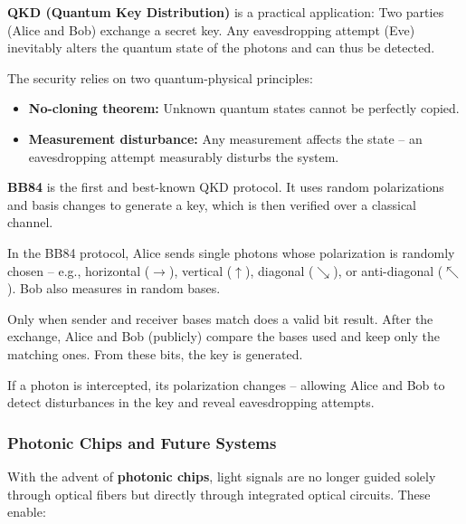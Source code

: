 \textbf{QKD (Quantum Key Distribution)} is a practical application: Two parties (Alice and Bob) exchange a secret key. Any eavesdropping attempt (Eve) inevitably alters the quantum state of the photons and can thus be detected.
\newpage
\noindent
\begin{tcolorbox}[didaktikbox, title=What Makes QKD Secure?] 
	\label{box:qkd}
	\small
	The security relies on two quantum-physical principles:
	\begin{itemize}
		\item \textbf{No-cloning theorem:} Unknown quantum states cannot be perfectly copied.
		\item \textbf{Measurement disturbance:} Any measurement affects the state – an eavesdropping attempt measurably disturbs the system.
	\end{itemize}
\end{tcolorbox}

\textbf{BB84} is the first and best-known QKD protocol. It uses random polarizations and basis changes to generate a key, which is then verified over a classical channel.

\vspace{1em}
\begin{tcolorbox}[didaktikbox, title={How Does QKD Work (e.g., BB84)?}] 
	\label{box:wie funktioniert QKD}
	\small
	In the BB84 protocol, Alice sends single photons whose polarization is randomly chosen – e.g., horizontal ($\rightarrow$), vertical ($\uparrow$), diagonal ($\searrow$), or anti-diagonal ($\nwarrow$). Bob also measures in random bases.
	
	Only when sender and receiver bases match does a valid bit result. After the exchange, Alice and Bob (publicly) compare the bases used and keep only the matching ones. From these bits, the key is generated.
	
	If a photon is intercepted, its polarization changes – allowing Alice and Bob to detect disturbances in the key and reveal eavesdropping attempts.
\end{tcolorbox}

\subsubsection{Photonic Chips and Future Systems}

With the advent of \textbf{photonic chips}, light signals are no longer guided solely through optical fibers but directly through integrated optical circuits. These enable:

